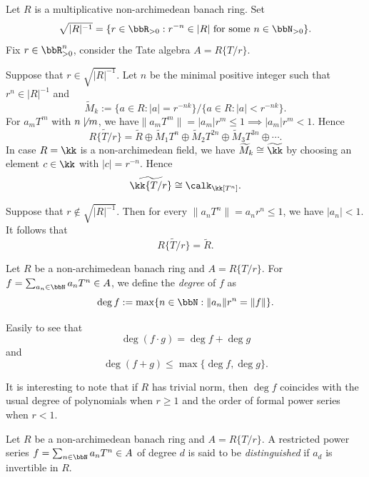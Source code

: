     \begin{example}\label{eg:reduction_ring_of_general_tate_algebra_over_a_banach_ring}
        Let \(R\) is a multiplicative non-archimedean banach ring.
        Set 
        \[\sqrt{|R|^{-1}} = \{ r \in \bbR_{>0} : r^{-n} \in |R| \text{ for some } n \in \bbN_{>0} \}.\]
        Fix \(r \in \bbR_{>0}^n\), consider the Tate algebra \(A = R\{T/r\}\).
        
        Suppose that \(r \in \sqrt{|R|^{-1}}\).
        Let \(n\) be the minimal positive integer such that \(r^n \in |R|^{-1}\) and 
        \[ \widetilde{M}_k:=\{a \in R: |a| = r^{-nk}\}/\{a \in R: |a| < r^{-nk}\}. \]
        For \(a_m T^m\) with \(n \not\mid m\), we have\( \|a_m T^m\| = |a_m| r^m \leq 1 \implies |a_m|r^m < 1\).
        Hence 
        \[ \widetilde{R\{T/r\}} = \widetilde{R} \oplus \widetilde{M}_1 T^n \oplus \widetilde{M}_2 T^{2n} \oplus \widetilde{M}_3 T^{3n} \oplus \cdots. \]
        In case \(R = \kk\) is a non-archimedean field, we have \(\widetilde{M}_k \cong \widetilde{\kk}\) by choosing an element \(c \in \kk\) with \(|c| = r^{-n}\).
        Hence 
        \[ \widetilde{\kk\{T/r\}} \cong \calk_\kk[T^n]. \]

        Suppose that \(r \notin \sqrt{|R|^{-1}}\).
        Then for every \(\|a_n T^n\| = a_n r^n \leq 1\), we have \(|a_n| < 1\).
        It follows that
        \[ \widetilde{R\{T/r\}} = \widetilde{R}. \]
    \end{example}

    \begin{definition}\label{def:degree_of_restricted_power_series}
        Let \(R\) be a non-archimedean banach ring and \(A = R\{T/r\}\).
        For \(f = \sum_{a_n \in \bbN} a_n T^n \in A\), we define the \emph{degree} of \(f\) as 
        \[ \deg f := \max \{ n \in \bbN : \|a_n\| r^n = \|f\| \}. \]
    \end{definition}

    Easily to see that
    \[ \deg(f \cdot g) = \deg f + \deg g \]
    and 
    \[ \deg(f + g) \leq \max\{\deg f, \deg g\}. \]

    It is interesting to note that if \(R\) has trivial norm, then \(\deg f\) coincides with the usual degree of polynomials when \(r \geq 1\) and the order of formal power series when \(r < 1\).

    \begin{definition}\label{def:distinguished_restricted_power_series}
        Let \(R\) be a non-archimedean banach ring and \(A = R\{T/r\}\).
        A restricted power series \(f = \sum_{n \in \bbN} a_n T^n \in A\) of degree \(d\) is said to be \emph{distinguished} if \(a_d\) is invertible in \(R\).
    \end{definition}

